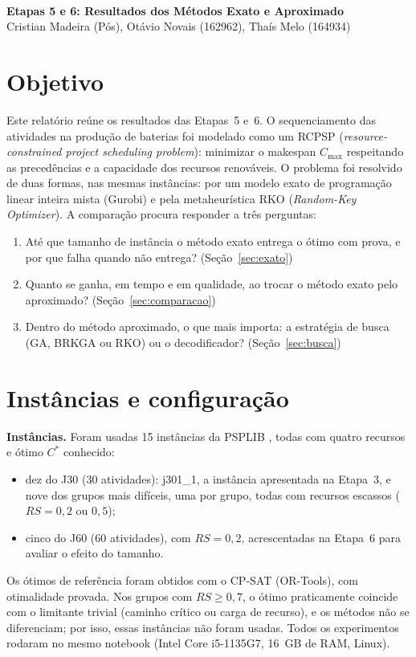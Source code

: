 \documentclass[11pt,a4paper]{article}
\newcommand{\cmax}{C_{\max}}
\begin{document}
\\[6pt]
{\bfseries Etapas 5 e 6: Resultados dos Métodos Exato e Aproximado}\\
Cristian Madeira (Pós), Otávio Novais (162962), Thaís Melo (164934)

\section{Objetivo}

Este relatório reúne os resultados das Etapas~5 e~6. O sequenciamento das atividades na produção
de baterias foi modelado como um RCPSP (\emph{resource-constrained project scheduling problem}):
minimizar o makespan $\cmax$ respeitando as precedências e a capacidade dos recursos renováveis.
O problema foi resolvido de duas formas, nas mesmas instâncias: por um modelo exato de programação
linear inteira mista (Gurobi) e pela metaheurística RKO (\emph{Random-Key Optimizer}). A
comparação procura responder a três perguntas:
\begin{enumerate}
  \item Até que tamanho de instância o método exato entrega o ótimo com prova, e por que falha
        quando não entrega? (Seção~\ref{sec:exato})
  \item Quanto se ganha, em tempo e em qualidade, ao trocar o método exato pelo aproximado?
        (Seção~\ref{sec:comparacao})
  \item Dentro do método aproximado, o que mais importa: a estratégia de busca (GA, BRKGA ou RKO)
        ou o decodificador? (Seção~\ref{sec:busca})
\end{enumerate}

\section{Instâncias e configuração}

\textbf{Instâncias.} Foram usadas 15 instâncias da PSPLIB \cite{psplib}, todas com quatro recursos
e ótimo $C^*$ conhecido:
\begin{itemize}
  \item dez do J30 (30 atividades): j301\_1, a instância apresentada na Etapa~3, e nove dos grupos
        mais difíceis, uma por grupo, todas com recursos escassos ($RS = 0{,}2$ ou $0{,}5$);
  \item cinco do J60 (60 atividades), com $RS = 0{,}2$, acrescentadas na Etapa~6 para avaliar o
        efeito do tamanho.
\end{itemize}
Os ótimos de referência foram obtidos com o CP-SAT (OR-Tools), com otimalidade provada. Nos grupos
com $RS \ge 0{,}7$, o ótimo praticamente coincide com o limitante trivial (caminho crítico ou carga
de recurso), e os métodos não se diferenciam; por isso, essas instâncias não foram usadas. Todos os
experimentos rodaram no mesmo notebook (Intel Core i5-1135G7, 16~GB de RAM, Linux).
\end{document}
